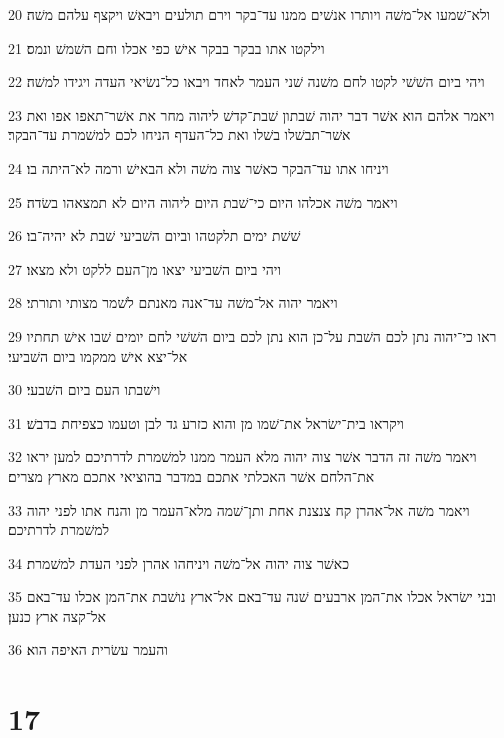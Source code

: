 \par 20 ולא־שׁמעו אל־משׁה ויותרו אנשׁים ממנו עד־בקר וירם תולעים ויבאשׁ ויקצף עלהם משׁה׃
\par 21 וילקטו אתו בבקר בבקר אישׁ כפי אכלו וחם השׁמשׁ ונמס׃
\par 22 ויהי ביום השׁשׁי לקטו לחם משׁנה שׁני העמר לאחד ויבאו כל־נשׂיאי העדה ויגידו למשׁה׃
\par 23 ויאמר אלהם הוא אשׁר דבר יהוה שׁבתון שׁבת־קדשׁ ליהוה מחר את אשׁר־תאפו אפו ואת אשׁר־תבשׁלו בשׁלו ואת כל־העדף הניחו לכם למשׁמרת עד־הבקר׃
\par 24 ויניחו אתו עד־הבקר כאשׁר צוה משׁה ולא הבאישׁ ורמה לא־היתה בו׃
\par 25 ויאמר משׁה אכלהו היום כי־שׁבת היום ליהוה היום לא תמצאהו בשׂדה׃
\par 26 שׁשׁת ימים תלקטהו וביום השׁביעי שׁבת לא יהיה־בו׃
\par 27 ויהי ביום השׁביעי יצאו מן־העם ללקט ולא מצאו׃
\par 28 ויאמר יהוה אל־משׁה עד־אנה מאנתם לשׁמר מצותי ותורתי׃
\par 29 ראו כי־יהוה נתן לכם השׁבת על־כן הוא נתן לכם ביום השׁשׁי לחם יומים שׁבו אישׁ תחתיו אל־יצא אישׁ ממקמו ביום השׁביעי׃
\par 30 וישׁבתו העם ביום השׁבעי׃
\par 31 ויקראו בית־ישׂראל את־שׁמו מן והוא כזרע גד לבן וטעמו כצפיחת בדבשׁ׃
\par 32 ויאמר משׁה זה הדבר אשׁר צוה יהוה מלא העמר ממנו למשׁמרת לדרתיכם למען יראו את־הלחם אשׁר האכלתי אתכם במדבר בהוציאי אתכם מארץ מצרים׃
\par 33 ויאמר משׁה אל־אהרן קח צנצנת אחת ותן־שׁמה מלא־העמר מן והנח אתו לפני יהוה למשׁמרת לדרתיכם׃
\par 34 כאשׁר צוה יהוה אל־משׁה ויניחהו אהרן לפני העדת למשׁמרת׃
\par 35 ובני ישׂראל אכלו את־המן ארבעים שׁנה עד־באם אל־ארץ נושׁבת את־המן אכלו עד־באם אל־קצה ארץ כנען׃
\par 36 והעמר עשׂרית האיפה הוא׃

\chapter{17}

